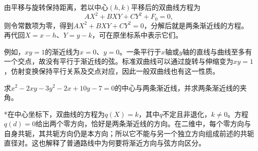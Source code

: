 由平移与旋转保持距离，若以中心\((h,k)\)平移后的双曲线方程为
\begin{equation*}
    AX^2+BXY+CY^2+F_0=0 ,
\end{equation*}
则令常数项为零，得到\(AX^2+BXY+CY^2=0\)，分解后就是两条渐近线的方程。再代回\(X=x-h\)、\(Y=y-k\)，可在原坐标系中表示它们。

例如，\(xy=1\)的渐近线为\(x=0\)、\(y=0\)。一条平行于\(x\)轴或\(y\)轴的直线与曲线至多有一个交点，故没有平行于渐近线的弦。标准双曲线可以通过旋转与伸缩变为\(xy=1\)，仿射变换保持平行关系及交点对应，因此一般双曲线也有这一性质。

\begin{example}
求\(x^2-2xy-3y^2-2x+10y-7=0\)的中心与两条渐近线，并求两条渐近线的夹角。
\end{example}

{\kaiti{}*\quad 在中心坐标下，双曲线的方程为\(q(X)=k\)，其中\(q\)不定且非退化，\(k\ne0\)。方程\(q(d)=0\)给出两个零方向，恰好是两条渐近线的方向。在二维中，每个零方向与自身共轭，其共轭方向仍是本方向；所以它不能与另一个独立方向组成前述的共轭直径对。这也解释了普通路线中为何要将渐近方向与弦方向区分。}


